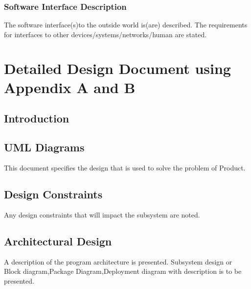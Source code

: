 \documentclass[12pt,a4paper]{article}
\begin{document}
 
 \subsubsection{Software Interface Description}	 
The software interface(s)to the outside world is(are) described.
The requirements for interfaces to other devices/systems/networks/human are stated.



\section{Detailed Design Document using Appendix A and B}
\setcounter{section}{8}

 \subsection{Introduction}  
 \subsection{UML Diagrams}

This document specifies the design that is used to solve the problem of Product.  
\subsection{Design Constraints}	
Any design constraints that will impact the subsystem are noted.
\subsection{Architectural Design}  
	A description of the program architecture is presented. Subsystem design or Block diagram,Package Diagram,Deployment diagram with description is to be presented.
\end{document}
